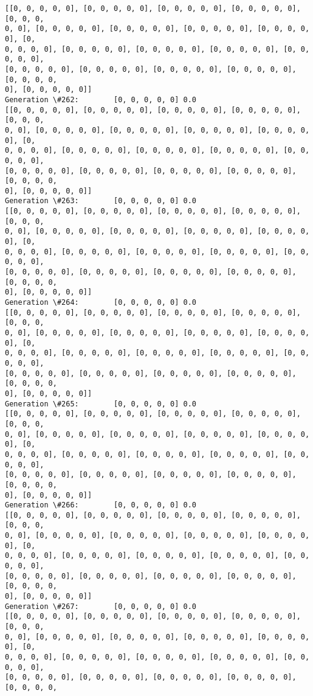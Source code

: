 \documentclass[11pt]{article}
\begin{document}
\begin{Verbatim}[commandchars=\\\{\}]
[[0, 0, 0, 0, 0], [0, 0, 0, 0, 0], [0, 0, 0, 0, 0], [0, 0, 0, 0, 0], [0, 0, 0,
0, 0], [0, 0, 0, 0, 0], [0, 0, 0, 0, 0], [0, 0, 0, 0, 0], [0, 0, 0, 0, 0], [0,
0, 0, 0, 0], [0, 0, 0, 0, 0], [0, 0, 0, 0, 0], [0, 0, 0, 0, 0], [0, 0, 0, 0, 0],
[0, 0, 0, 0, 0], [0, 0, 0, 0, 0], [0, 0, 0, 0, 0], [0, 0, 0, 0, 0], [0, 0, 0, 0,
0], [0, 0, 0, 0, 0]]
Generation \#262:        [0, 0, 0, 0, 0] 0.0
[[0, 0, 0, 0, 0], [0, 0, 0, 0, 0], [0, 0, 0, 0, 0], [0, 0, 0, 0, 0], [0, 0, 0,
0, 0], [0, 0, 0, 0, 0], [0, 0, 0, 0, 0], [0, 0, 0, 0, 0], [0, 0, 0, 0, 0], [0,
0, 0, 0, 0], [0, 0, 0, 0, 0], [0, 0, 0, 0, 0], [0, 0, 0, 0, 0], [0, 0, 0, 0, 0],
[0, 0, 0, 0, 0], [0, 0, 0, 0, 0], [0, 0, 0, 0, 0], [0, 0, 0, 0, 0], [0, 0, 0, 0,
0], [0, 0, 0, 0, 0]]
Generation \#263:        [0, 0, 0, 0, 0] 0.0
[[0, 0, 0, 0, 0], [0, 0, 0, 0, 0], [0, 0, 0, 0, 0], [0, 0, 0, 0, 0], [0, 0, 0,
0, 0], [0, 0, 0, 0, 0], [0, 0, 0, 0, 0], [0, 0, 0, 0, 0], [0, 0, 0, 0, 0], [0,
0, 0, 0, 0], [0, 0, 0, 0, 0], [0, 0, 0, 0, 0], [0, 0, 0, 0, 0], [0, 0, 0, 0, 0],
[0, 0, 0, 0, 0], [0, 0, 0, 0, 0], [0, 0, 0, 0, 0], [0, 0, 0, 0, 0], [0, 0, 0, 0,
0], [0, 0, 0, 0, 0]]
Generation \#264:        [0, 0, 0, 0, 0] 0.0
[[0, 0, 0, 0, 0], [0, 0, 0, 0, 0], [0, 0, 0, 0, 0], [0, 0, 0, 0, 0], [0, 0, 0,
0, 0], [0, 0, 0, 0, 0], [0, 0, 0, 0, 0], [0, 0, 0, 0, 0], [0, 0, 0, 0, 0], [0,
0, 0, 0, 0], [0, 0, 0, 0, 0], [0, 0, 0, 0, 0], [0, 0, 0, 0, 0], [0, 0, 0, 0, 0],
[0, 0, 0, 0, 0], [0, 0, 0, 0, 0], [0, 0, 0, 0, 0], [0, 0, 0, 0, 0], [0, 0, 0, 0,
0], [0, 0, 0, 0, 0]]
Generation \#265:        [0, 0, 0, 0, 0] 0.0
[[0, 0, 0, 0, 0], [0, 0, 0, 0, 0], [0, 0, 0, 0, 0], [0, 0, 0, 0, 0], [0, 0, 0,
0, 0], [0, 0, 0, 0, 0], [0, 0, 0, 0, 0], [0, 0, 0, 0, 0], [0, 0, 0, 0, 0], [0,
0, 0, 0, 0], [0, 0, 0, 0, 0], [0, 0, 0, 0, 0], [0, 0, 0, 0, 0], [0, 0, 0, 0, 0],
[0, 0, 0, 0, 0], [0, 0, 0, 0, 0], [0, 0, 0, 0, 0], [0, 0, 0, 0, 0], [0, 0, 0, 0,
0], [0, 0, 0, 0, 0]]
Generation \#266:        [0, 0, 0, 0, 0] 0.0
[[0, 0, 0, 0, 0], [0, 0, 0, 0, 0], [0, 0, 0, 0, 0], [0, 0, 0, 0, 0], [0, 0, 0,
0, 0], [0, 0, 0, 0, 0], [0, 0, 0, 0, 0], [0, 0, 0, 0, 0], [0, 0, 0, 0, 0], [0,
0, 0, 0, 0], [0, 0, 0, 0, 0], [0, 0, 0, 0, 0], [0, 0, 0, 0, 0], [0, 0, 0, 0, 0],
[0, 0, 0, 0, 0], [0, 0, 0, 0, 0], [0, 0, 0, 0, 0], [0, 0, 0, 0, 0], [0, 0, 0, 0,
0], [0, 0, 0, 0, 0]]
Generation \#267:        [0, 0, 0, 0, 0] 0.0
[[0, 0, 0, 0, 0], [0, 0, 0, 0, 0], [0, 0, 0, 0, 0], [0, 0, 0, 0, 0], [0, 0, 0,
0, 0], [0, 0, 0, 0, 0], [0, 0, 0, 0, 0], [0, 0, 0, 0, 0], [0, 0, 0, 0, 0], [0,
0, 0, 0, 0], [0, 0, 0, 0, 0], [0, 0, 0, 0, 0], [0, 0, 0, 0, 0], [0, 0, 0, 0, 0],
[0, 0, 0, 0, 0], [0, 0, 0, 0, 0], [0, 0, 0, 0, 0], [0, 0, 0, 0, 0], [0, 0, 0, 0,

\end{Verbatim}
\end{document}
